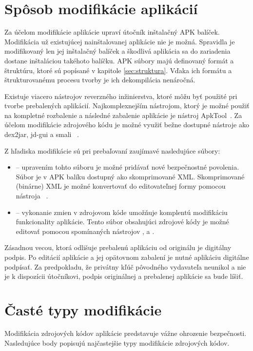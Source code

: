 \section{Spôsob modifikácie aplikácií}
Za účelom modifikácie aplikácie upraví útočník inštalačný APK balíček. Modifikácia už existujúcej nainštalovanej aplikácie nie je možná. Spravidla je modifikovaný len jej inštalačný balíček a škodlivá aplikácia sa do zariadenia dostane inštaláciou takéhoto balíčku.
APK súbory majú definovaný formát a štruktúru, ktoré sú popísané v kapitole \ref{sec:struktura}. Vďaka ich formátu a štrukturovanému procesu tvorby je ich dekompilácia nenáročná.

Existuje viacero nástrojov reverzného inžinierstva, ktoré môžu byť použité pri tvorbe prebalených aplikácií. Najkomplexnejším nástrojom, ktorý je možné použiť na kompletné rozbalenie a následné zabalenie aplikácie je nástroj ApkTool~\cite{Apktool}. Za účelom modifikácie zdrojového kódu je možné využiť bežne dostupné nástroje ako dex2jar, jd-gui a smali ~\cite{Dex2jar, jdgui, smali}.

Z hľadiska modifikácie sú pri prebaľovaní zaujímavé nasledujúce súbory:

\begin{itemize}
	\item {} -- upravením tohto súboru je možné pridávať nové bezpečnostné povolenia. Súbor je v APK balíku dostupný ako skomprimované XML. Skomprimované (binárne) XML je možné konvertovať do editovateľnej formy pomocou nástroja ~\cite{Apktool}.
	\item {} -- vykonanie zmien v zdrojovom kóde umožňuje komplentú modifikáciu funkcionality aplikácie. Tento súbor obsahujúci zdrojové kódy je možné editovať pomocou spomínaných nástrojov ,  a .
\end{itemize}

Zásadnou vecou, ktorá odlišuje prebalenú aplikáciu od originálu je digitálny podpis. Po editácií aplikácie a jej opätovnom zabalení je nutné aplikáciu digitálne podpísať. Za predpokladu, že privátny kľúč pôvodného vydavateľa neunikol a nie je k dispozícii útočníkovi, podpis originálnej a prebalenej aplikácie sa bude líšiť. 

\section{Časté typy modifikácie}

Modifikácia zdrojových kódov aplikácie predstavuje vážne ohrozenie bezpečnosti. Nasledujúce body popisujú najčastejšie typy modifikácie zdrojových kódov.

